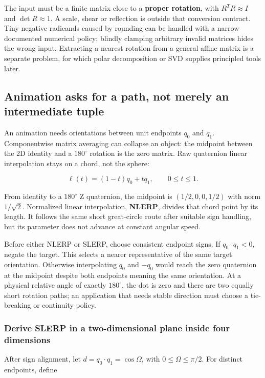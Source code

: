 The input must be a finite matrix close to a \textbf{proper rotation}, with \(R^TR\approx I\) and \(\det R\approx1\). A scale, shear or reflection is outside that conversion contract. Tiny negative radicands caused by rounding can be handled with a narrow documented numerical policy; blindly clamping arbitrary invalid matrices hides the wrong input. Extracting a nearest rotation from a general affine matrix is a separate problem, for which polar decomposition or SVD supplies principled tools later.

\subsection{Animation asks for a path, not merely an intermediate tuple}\label{animation-asks-for-a-path-not-merely-an-intermediate-tuple}

An animation needs orientations between unit endpoints \(q_0\) and \(q_1\). Componentwise matrix averaging can collapse an object: the midpoint between the 2D identity and a \(180^\circ\) rotation is the zero matrix. Raw quaternion linear interpolation stays on a chord, not the sphere:

\[
\ell(t)=(1-t)q_0+tq_1,\qquad 0\le t\le1.
\]

From identity to a \(180^\circ\) Z quaternion, the midpoint is \((1/2,0,0,1/2)\) with norm \(1/\sqrt2\). Normalized linear interpolation, \textbf{NLERP}, divides that chord point by its length. It follows the same short great-circle route after suitable sign handling, but its parameter does not advance at constant angular speed.

Before either NLERP or SLERP, choose consistent endpoint signs. If \(q_0\cdot q_1<0\), negate the target. This selects a nearer representative of the same target orientation. Otherwise interpolating \(q_0\) and \(-q_0\) would reach the zero quaternion at the midpoint despite both endpoints meaning the same orientation. At a physical relative angle of exactly \(180^\circ\), the dot is zero and there are two equally short rotation paths; an application that needs stable direction must choose a tie-breaking or continuity policy.

\subsubsection{Derive SLERP in a two-dimensional plane inside four dimensions}\label{derive-slerp-in-a-two-dimensional-plane-inside-four-dimensions}

After sign alignment, let \(d=q_0\cdot q_1=\cos\Omega\), with \(0\le\Omega\le\pi/2\). For distinct endpoints, define


